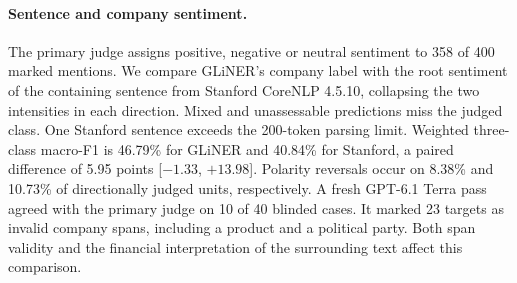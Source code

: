 \paragraph{Sentence and company sentiment.}
The primary judge assigns positive, negative or neutral sentiment to
358 of 400 marked mentions. We compare GLiNER's company label with
the root sentiment of the containing sentence from Stanford CoreNLP
4.5.10, collapsing the two intensities in each direction. Mixed and
unassessable predictions miss the judged class. One Stanford sentence
exceeds the 200-token parsing limit. Weighted three-class macro-F1 is
46.79\% for GLiNER and 40.84\% for Stanford, a paired difference of
5.95 points [$-1.33$, $+13.98$]. Polarity reversals occur on 8.38\%
and 10.73\% of directionally judged units, respectively. A fresh
GPT-6.1 Terra pass agreed with the primary judge on 10 of 40 blinded
cases. It marked 23 targets as invalid company spans, including a
product and a political party. Both span validity and the financial
interpretation of the surrounding text affect this comparison.

